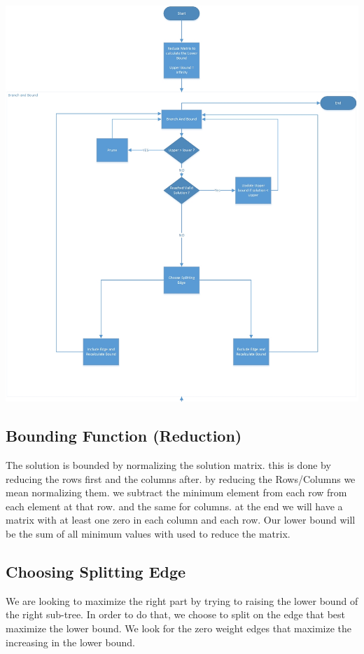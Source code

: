 \documentclass[14pt, english]{article}
\begin{document}
\includegraphics[width = \textwidth]{bnb-flow.jpg}

\newpage
\subsection{Bounding Function (Reduction)}
The solution is bounded by normalizing the solution matrix. this is done by reducing the rows first and the columns after.
by reducing the Rows/Columns we mean normalizing them. we subtract the minimum element from each row from each element at that row. and the same for columns. at the end we will have a matrix with at least one zero in each column and each row.
Our lower bound will be the sum of all minimum values with used to reduce the matrix.

\subsection{Choosing Splitting Edge}
We are looking to maximize the right part by trying to raising the lower bound of the right sub-tree. In order to do that, we choose to split on the edge that best maximize the lower bound. We look for the zero weight edges that maximize the increasing in the lower bound.
\end{document}
